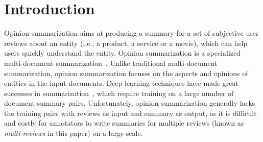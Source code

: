 \section{Introduction}
\label{sec:intro}
Opinion summarization aims at
producing a summary for a set of 
subjective user reviews about an entity (i.e.,
a product, a service or a movie), which can help users quickly understand the entity.
Opinion summarization is a specialized multi-document 
summarization~\cite{FabbriLSLR19,LiuSPGSKS18,multisumSIG21}.
Unlike traditional multi-document summarization, opinion summarization focuses on the aspects and opinions of entities in the input documents.
Deep learning techniques have made great successes 
in summarization~\cite{SeeLM17,LiuLZ18,BART20,liu2021keyword},
which require training on a large number of document-summary pairs.
Unfortunately, opinion summarization generally lacks the training pairs with reviews as input 
and summary as output, as it is difficult and costly for annotators to write 
summaries for multiple reviews (known as \textit{multi-reviews} in this paper) 
on a large scale.

